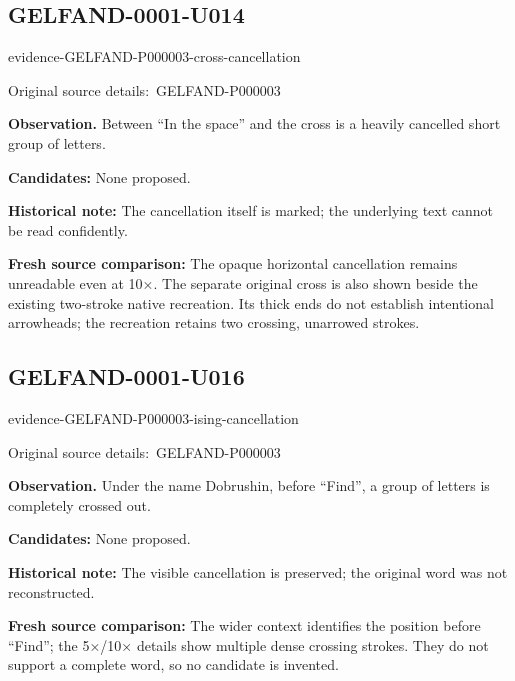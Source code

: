 \documentclass[11pt]{article}
\newcommand{\EvidenceBlock}[4]{%
 \par\smallskip\noindent\begin{minipage}{\linewidth}
 \begin{minipage}[t]{.47\linewidth}\vspace{0pt}\centering
 \csname evidence-#1-#2\endcsname\par
 {\scriptsize\SourceCropCaption\ #1}\par
 \end{minipage}\hfill
 \begin{minipage}[t]{.49\linewidth}\vspace{0pt}\raggedright
 {\small\color{orange!65!black}\textbf{#4} #3}\par
 \end{minipage}
 \end{minipage}\par\smallskip}
\newcommand{\SourceCropCaption}{Original source details:}\newcommand{\ReadingCaption}{Uncertain reading.}\newcommand{\IncompleteCaption}{Undeciphered passage.}\newcommand{\DiagramCaption}{Diagram and typed description.}
\begin{document}
\subsection*{GELFAND-0001-U014}
\EvidenceBlock{GELFAND-P000003}{cross-cancellation}{Between “In the space” and the cross is a heavily cancelled short group of letters.}{Observation.}
\par\smallskip\noindent\textbf{Candidates: } None proposed.\par
\par\smallskip\noindent\textbf{Historical note: } The cancellation itself is marked; the underlying text cannot be read confidently.\par
\par\smallskip\noindent\textbf{Fresh source comparison: } The opaque horizontal cancellation remains unreadable even at 10×. The separate original cross is also shown beside the existing two-stroke native recreation. Its thick ends do not establish intentional arrowheads; the recreation retains two crossing, unarrowed strokes.\par

\subsection*{GELFAND-0001-U016}
\EvidenceBlock{GELFAND-P000003}{ising-cancellation}{Under the name Dobrushin, before “Find”, a group of letters is completely crossed out.}{Observation.}
\par\smallskip\noindent\textbf{Candidates: } None proposed.\par
\par\smallskip\noindent\textbf{Historical note: } The visible cancellation is preserved; the original word was not reconstructed.\par
\par\smallskip\noindent\textbf{Fresh source comparison: } The wider context identifies the position before “Find”; the 5×/10× details show multiple dense crossing strokes. They do not support a complete word, so no candidate is invented.\par
\end{document}
